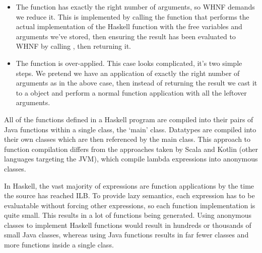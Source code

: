 \documentclass[dissertation.tex]{subfiles}
\begin{document}
{{{{\begin{enumerate}
{\begin{itemize}
{                        The function is partially applied, so hasn't yet received all of the necessary arguments to be
                        evaluated. Such a function is already in WHNF, so we can just return it.

                    }
                    \item
                    {

                        The function has exactly the right number of arguments, so WHNF demands we reduce it. This is
                        implemented by calling the  function that performs the actual implementation of the
                        Haskell function with the free variables and arguments we've stored, then ensuring the result
                        has been evaluated to WHNF by calling , then returning it.

                    }
                    \item
                    {

                        The function is over-applied. This case looks complicated, it's two simple steps. We pretend we
                        have an application of exactly the right number of arguments as in the above case, then instead
                        of returning the result we cast it to a  object and perform a normal function
                        application with all the leftover arguments.

                    }
                    \end{itemize}
                }
                \end{enumerate}

                All of the functions defined in a Haskell program are compiled into their pairs of Java functions within
                a single class, the `main' class. Datatypes are compiled into their own classes which are then
                referenced by the main class. This approach to function compilation differs from the approaches taken by
                Scala and Kotlin (other languages targeting the JVM), which compile lambda expressions into anonymous
                classes.

                In Haskell, the vast majority of expressions are function applications by the time the source has
                reached ILB. To provide lazy semantics, each expression has to be evaluatable without forcing other
                expressions, so each function implementation is quite small. This results in a lot of functions being
                generated. Using anonymous classes to implement Haskell functions would result in hundreds or thousands
                of small Java classes, whereas using Java functions results in far fewer classes and more functions
                inside a single class.

}}}}
\end{document}

